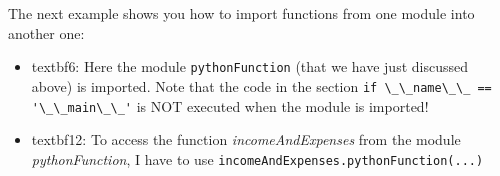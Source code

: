 The next example shows you how to import functions from one module into another one:



\begin{itemize}
  \item textbf{6:} Here the module \lstinline{pythonFunction} (that we have just discussed above) is imported. Note that the code in the section \lstinline{if \_\_name\_\_ == '\_\_main\_\_'} is NOT executed when the module is imported!
  \item textbf{12:} To access the function \emph{incomeAndExpenses} from the module \emph{pythonFunction}, I have to use \lstinline{incomeAndExpenses.pythonFunction(...)}
\end{itemize}


